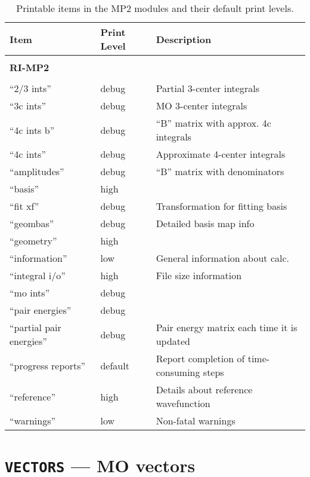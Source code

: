 \begin{table}
\caption{Printable items in the MP2 modules and their default print levels.}
\label{tbl:mp2-printable}
\begin{tabular}{lll}
\hline\hline
Item                    & Print Level   & Description \\
\hline

        & & \\ 
{\bf RI-MP2}  & & \\ \hline
        & & \\ 
``2/3 ints''              & debug         & Partial 3-center integrals \\
``3c ints''               & debug         & MO 3-center integrals  \\
``4c ints b''             & debug         & ``B'' matrix with approx. 4c integrals \\
``4c ints''               & debug         & Approximate 4-center integrals \\
``amplitudes''            & debug         & ``B'' matrix with denominators \\
``basis''                 & high          & \\
``fit xf''                & debug         & Transformation for fitting basis \\
``geombas''               & debug         & Detailed basis map info\\
``geometry''              & high          & \\
``information''           & low           & General information about calc.\\
``integral i/o''          & high          & File size information\\
``mo ints''               & debug         & \\
``pair energies''         & debug         & \\
``partial pair energies'' & debug         & Pair energy matrix each time it is updated \\
``progress reports''      & default       & Report completion of time-consuming steps\\
``reference''             & high          & Details about reference wavefunction\\
``warnings''              & low           & Non-fatal warnings \\
\hline\hline
\end{tabular}
\end{table}

\section{{\tt VECTORS} --- MO vectors}
\label{sec:mp2vectors}

